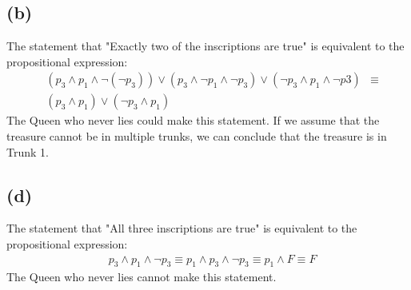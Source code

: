 \documentclass{article}
\begin{document}
\subsection{(b)}
The statement that "Exactly two of the inscriptions are true" is equivalent to the propositional expression:
\begin{align*}
	 & (p_3 \land p_1 \land \neg (\neg p_3)) \lor (p_3 \land \neg p_1 \land \neg p_3) \lor (\neg p_3 \land p_1 \land \neg p3) & \equiv \\
	 & (p_3 \land p_1) \lor (\neg p_3 \land p_1)
\end{align*}
The Queen who never lies could make this statement. If we assume that the treasure cannot be in multiple trunks, we can conclude that the treasure is in Trunk 1.

\subsection{(d)}
The statement that "All three inscriptions are true" is equivalent to the propositional expression:
\begin{align*}
	 & p_3 \land p_1 \land \neg p_3 \equiv p_1 \land p_3 \land \neg p_3 \equiv p_1 \land F \equiv F
\end{align*}
The Queen who never lies cannot make this statement.
\end{document}
